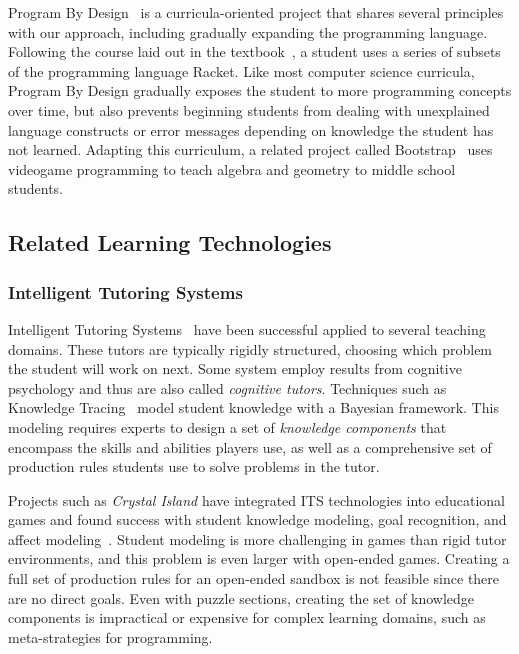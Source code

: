 \documentclass{sig-alternate}
\begin{document}
Program By Design~\cite{programbydesign} is a curricula-oriented project that shares several principles with our approach, including gradually expanding the programming language. 
Following the course laid out in the textbook~\cite{felleisen2001design}, a student uses a series of subsets of the programming language Racket.
Like most computer science curricula, Program By Design gradually exposes the student to more programming concepts over time, but also prevents beginning students from dealing with unexplained language constructs or error messages depending on knowledge the student has not learned.
Adapting this curriculum, a related project called Bootstrap~\cite{bootstrap} uses videogame programming to teach algebra and geometry to middle school students.

\subsection{Related Learning Technologies}

\subsubsection{Intelligent Tutoring Systems}
Intelligent Tutoring Systems~\cite{koedinger06cognitive} have been successful applied to several teaching domains.
These tutors are typically rigidly structured, choosing which problem the student will work on next.
Some system employ results from cognitive psychology and thus are also called \emph{cognitive tutors}.
Techniques such as Knowledge Tracing~\cite{corbett1994knowledge} model student knowledge with a Bayesian framework.
This modeling requires experts to design a set of \emph{knowledge components} that encompass the skills and abilities players use, as well as a comprehensive set of production rules students use to solve problems in the tutor.

Projects such as \emph{Crystal Island} have integrated ITS technologies into educational games and found success with student knowledge modeling, goal recognition, and affect modeling~\cite{lester2013serious,rowe2010modeling}.
Student modeling is more challenging in games than rigid tutor environments, and this problem is even larger with open-ended games.
Creating a full set of production rules for an open-ended sandbox is not feasible since there are no direct goals.
Even with puzzle sections, creating the set of knowledge components is impractical or expensive for complex learning domains, such as meta-strategies for programming.
\end{document}
